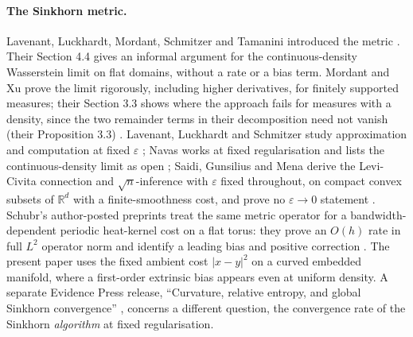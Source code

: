 \documentclass[11pt,a4paper]{article}
\theoremstyle{definition}\newtheorem{definition}[theorem]{Definition}
\theoremstyle{remark}\newtheorem{remark}[theorem]{Remark}
\newcommand{\eps}{\varepsilon}
\newcommand{\R}{\mathbb R}
\begin{document}
\paragraph{The Sinkhorn metric.} Lavenant, Luckhardt, Mordant, Schmitzer and Tamanini introduced the metric \cite{LLMST}. Their Section 4.4 gives an informal argument for the continuous-density Wasserstein limit on flat domains, without a rate or a bias term. Mordant and Xu prove the limit rigorously, including higher derivatives, for finitely supported measures; their Section 3.3 shows where the approach fails for measures with a density, since the two remainder terms in their decomposition need not vanish (their Proposition 3.3) \cite{MX}. Lavenant, Luckhardt and Schmitzer study approximation and computation at fixed $\eps$ \cite{LLS}; Navas works at fixed regularisation and lists the continuous-density limit as open \cite{Navas}; Saidi, Gunsilius and Mena derive the Levi-Civita connection and $\sqrt n$-inference with $\eps$ fixed throughout, on compact convex subsets of $\R^d$ with a finite-smoothness cost, and prove no $\eps\to0$ statement \cite{Saidi}. Schubr's author-posted preprints treat the same metric operator for a bandwidth-dependent periodic heat-kernel cost on a flat torus: they prove an $O(h)$ rate in full $L^2$ operator norm and identify a leading bias and positive correction \cite{SchubrSharp,SchubrBias}. The present paper uses the fixed ambient cost $|x-y|^2$ on a curved embedded manifold, where a first-order extrinsic bias appears even at uniform density. A separate Evidence Press release, ``Curvature, relative entropy, and global Sinkhorn convergence'' \cite{EPglobal}, concerns a different question, the convergence rate of the Sinkhorn \emph{algorithm} at fixed regularisation.
\end{document}
